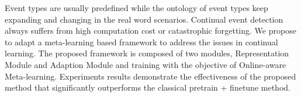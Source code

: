 Event types are usually predefined while the ontology of event types keep expanding and changing in the real word scenarios. Continual event detection always suffers from high computation cost or catastrophic forgetting. We propose to adapt a meta-learning based framework to address the issues in continual learning. The proposed framework is composed of two modules, Representation Module and Adaption Module and training with the objective of Online-aware Meta-learning. Experiments results demonstrate the effectiveness of the proposed method that significantly outperforms the classical pretrain + finetune method. 